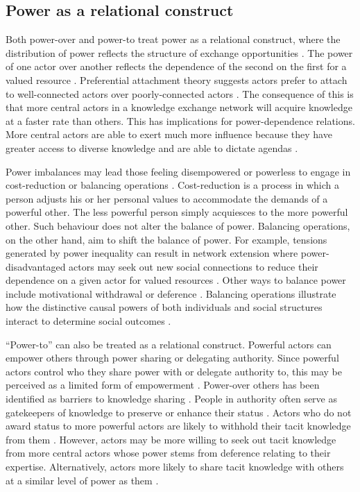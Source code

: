 \subsection{Power as a relational construct}

Both power-over and power-to treat power as a relational construct, where the distribution of power reflects the structure of exchange opportunities \citep{blau1964exchange,reagans2008knowledge,bonacich2009structural}. The power of one actor over another reflects the dependence of the second on the first for a valued resource \citep{emerson1962power}. Preferential attachment theory suggests actors prefer to attach to well-connected actors over poorly-connected actors \citep{barabasi1999emergence}. The consequence of this is that more central actors in a knowledge exchange network will acquire knowledge at a faster rate than others. This has implications for power-dependence relations. More central actors are able to exert much more influence because they have greater access to diverse knowledge and are able to dictate agendas \citep{bonacich1987power,foucault1980power}. \medskip

Power imbalances may lead those feeling disempowered or powerless to engage in cost-reduction or balancing operations \citep{emerson1962power}. Cost-reduction is a process in which a person adjusts his or her personal values to accommodate the demands of a powerful other. The less powerful person simply acquiesces to the more powerful other. Such behaviour does not alter the balance of power. Balancing operations, on the other hand, aim to shift the balance of power. For example, tensions generated by power inequality can result in network extension where power-disadvantaged actors may seek out new social connections to reduce their dependence on a given actor for valued resources \citep{cook2013social}. Other ways to balance power include motivational withdrawal or deference \citep{emerson1962power}. Balancing operations illustrate how the distinctive causal powers of both individuals and social structures interact to determine social outcomes \citep{loyal2001agency}. \medskip

\enquote{Power-to} can also be treated as a relational construct. Powerful actors can empower others through power sharing or delegating authority. Since powerful actors control who they share power with or delegate authority to, this may be perceived as a limited form of empowerment \citep{conger1988empowerment}. Power-over others has been identified as barriers to knowledge sharing \citep{riege2005three,suppiah2011organisational}. People in authority often serve as gatekeepers of knowledge to preserve or enhance their status \citep{cross2001beyond}. Actors who do not award status to more powerful actors are likely to withhold their tacit knowledge from them \citep{cabrera2006determinants}. However, actors may be more willing to seek out tacit knowledge from more central actors whose power stems from deference relating to their expertise. Alternatively, actors more likely to share tacit knowledge with others at a similar level of power as them \citep{cabrera2006determinants}. 

